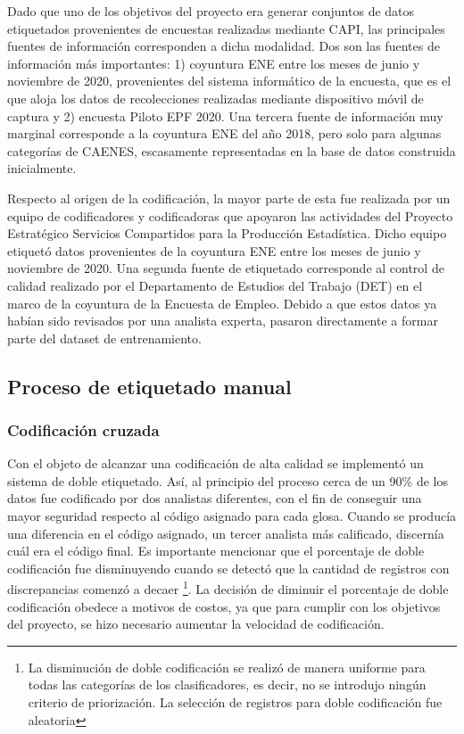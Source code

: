 \documentclass[
  12pt,
  spanish,
]{article}
\begin{document}
Dado que uno de los objetivos del proyecto era generar conjuntos de
datos etiquetados provenientes de encuestas realizadas mediante CAPI,
las principales fuentes de información corresponden a dicha modalidad.
Dos son las fuentes de información más importantes: 1) coyuntura ENE
entre los meses de junio y noviembre de 2020, provenientes del sistema
informático de la encuesta, que es el que aloja los datos de
recolecciones realizadas mediante dispositivo móvil de captura y 2)
encuesta Piloto EPF 2020. Una tercera fuente de información muy marginal
corresponde a la coyuntura ENE del año 2018, pero solo para algunas
categorías de CAENES, escasamente representadas en la base de datos
construida inicialmente.

Respecto al origen de la codificación, la mayor parte de esta fue
realizada por un equipo de codificadores y codificadoras que apoyaron
las actividades del Proyecto Estratégico Servicios Compartidos para la
Producción Estadística. Dicho equipo etiquetó datos provenientes de la
coyuntura ENE entre los meses de junio y noviembre de 2020. Una segunda
fuente de etiquetado corresponde al control de calidad realizado por el
Departamento de Estudios del Trabajo (DET) en el marco de la coyuntura
de la Encuesta de Empleo. Debido a que estos datos ya habían sido
revisados por una analista experta, pasaron directamente a formar parte
del dataset de entrenamiento.

\hypertarget{proceso-de-etiquetado-manual}{%
\subsection{Proceso de etiquetado
manual}\label{proceso-de-etiquetado-manual}}

\hypertarget{codificaciuxf3n-cruzada}{%
\subsubsection{Codificación cruzada}\label{codificaciuxf3n-cruzada}}

Con el objeto de alcanzar una codificación de alta calidad se implementó
un sistema de doble etiquetado. Así, al principio del proceso cerca de
un 90\% de los datos fue codificado por dos analistas diferentes, con el
fin de conseguir una mayor seguridad respecto al código asignado para
cada glosa. Cuando se producía una diferencia en el código asignado, un
tercer analista más calificado, discernía cuál era el código final. Es
importante mencionar que el porcentaje de doble codificación fue
disminuyendo cuando se detectó que la cantidad de registros con
discrepancias comenzó a decaer
\footnote{La disminución de doble codificación se realizó de manera uniforme para todas las categorías de los clasificadores, es decir, no se introdujo ningún criterio de priorización. La selección de registros para doble codificación fue aleatoria}.
La decisión de diminuir el porcentaje de doble codificación obedece a
motivos de costos, ya que para cumplir con los objetivos del proyecto,
se hizo necesario aumentar la velocidad de codificación.
\end{document}

